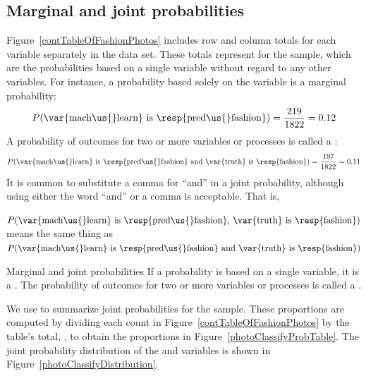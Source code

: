 \subsection{Marginal and joint probabilities}
\label{marginalAndJointProbabilities}


Figure~\ref{contTableOfFashionPhotos} includes row and
column totals for each variable separately in the
 data set.
These totals represent
for the sample, which are the probabilities based on a
single variable without regard to any other variables.
For instance, a probability based solely on the
 variable is a marginal probability:
\begin{align*}
P(\text{\var{mach\us{}learn} is \resp{pred\us{}fashion}})
    = \frac{\fashYA{}}{\fashN{}}
    = 0.12
\end{align*}
A probability of outcomes for two or more variables
or processes is called a
:
\begin{align*}
P(\text{\var{mach\us{}learn} is \resp{pred\us{}fashion}
    and \var{truth} is \resp{fashion}})
  = \frac{\fashYY{}}{\fashN{}}
  = 0.11
\end{align*}
It is common to substitute a comma for ``and'' in a joint
probability, although using either the word ``and'' or a
comma is acceptable.
That is,
\begin{center}
$P(\text{\var{mach\us{}learn} is \resp{pred\us{}fashion},
    \var{truth} is \resp{fashion}})$ \\[2mm]
means the same thing as \\[2mm]
$P(\text{\var{mach\us{}learn} is \resp{pred\us{}fashion}
    and \var{truth} is \resp{fashion}})$
\end{center}

\begin{onebox}{Marginal and joint probabilities}
  If a probability is based on a single variable,
  it is a \emph{}.
  The probability of outcomes for two or more variables
  or processes is called a \emph{}.
\end{onebox}

We use  to summarize joint probabilities
for the  sample.
These proportions are computed by dividing each count in
Figure~\ref{contTableOfFashionPhotos} by the table's total,
\fashN{}, to obtain the proportions in
Figure~\ref{photoClassifyProbTable}.
The joint probability distribution of the 
and  variables is shown in
Figure~\ref{photoClassifyDistribution}.

